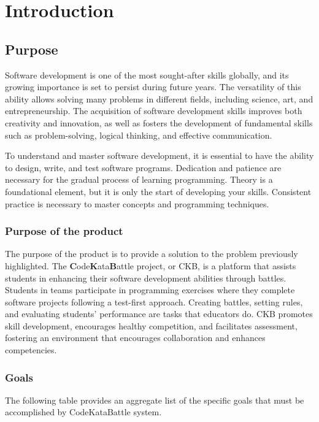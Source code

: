 \chapter{Introduction}

\section{Purpose}
Software development is one of the most sought-after skills globally, and its growing importance is set to persist during future years.
The versatility of this ability allows solving many problems in different fields, including science, art, and entrepreneurship.
The acquisition of software development skills improves both creativity and innovation, as well as fosters the development of fundamental skills such as problem-solving, logical thinking, and effective communication.

To understand and master software development, it is essential to have the ability to design, write, and test software programs.
Dedication and patience are necessary for the gradual process of learning programming.
Theory is a foundational element, but it is only the start of developing your skills. Consistent practice is necessary to master concepts and programming techniques.

\subsection{Purpose of the product}
The purpose of the product is to provide a solution to the problem previously highlighted.
The \textbf{C}ode\textbf{K}ata\textbf{B}attle project, or CKB, is a platform that assists students in enhancing their software development abilities through battles.
Students in teams participate in programming exercises where they complete software projects following a test-first approach.
Creating battles, setting rules, and evaluating students' performance are tasks that educators do.
CKB promotes skill development, encourages healthy competition, and facilitates assessment, fostering an environment that encourages collaboration and enhances competencies.

\subsection{Goals}
The following table provides an aggregate list of the specific goals that must be accomplished by CodeKataBattle system.

